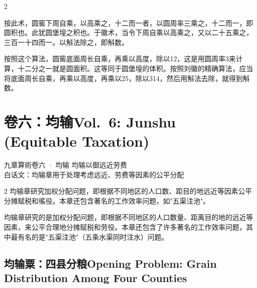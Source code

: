 \documentclass[11pt,a4paper]{article}
\newcommand{\bilingualsection}[2]{%
  \section{#1\hfill\normalfont\large\color{sectioncolor}#2}%
}
\newcommand{\bilingualsubsection}[2]{%
  \subsection{#1\hfill\normalfont\normalsize\color{sectioncolor}#2}%
}
\begin{document}
\vspace{0.2cm}

\begin{paracol}{2}

\begin{commentarybox}
按此术，圆窖下周自乘，以高乘之，十二而一者，以圆周率三乘之，十二而一，即圆积也。此犹圆堡堭之积也。于徽术，当令下周自乘以高乘之，又以二十五乘之，三百一十四而一。以斛法除之，即斛数。
\end{commentarybox}

\switchcolumn

\begin{commentarybox}
按照这个算法，圆窖底面周长自乘，再乘以高度，除以12，这是用圆周率3来计算，十二分之一就是圆面积。这等同于圆堡堭的体积。按照刘徽的精确算法，应当将底面周长自乘，再乘以高度，再乘以25，除以314，然后用斛法去除，就得到斛数。
\end{commentarybox}

\end{paracol}

\newpage

\bilingualsection{卷六：均输}{Vol.\ 6: Junshu (Equitable Taxation)}

\begin{volumeheader}{九章算術卷六 · 均输}
均输以御远近劳费\\[0.3em]
\small 白话文：均输章用于处理考虑远近、劳费等因素的公平分配
\end{volumeheader}

\vspace{0.5cm}

\begin{paracol}{2}
均输章研究加权分配问题，即根据不同地区的人口数、距目的地远近等因素公平分摊赋税和徭役。本章还包含著名的工作效率问题，如"五渠注池"。

\switchcolumn

均输章研究的是加权分配问题，即根据不同地区的人口数量、距离目的地的远近等因素，来公平合理地分摊赋税和劳役。本章还包含了许多著名的工作效率问题，其中最有名的是"五渠注池"（五条水渠同时注水）问题。

\end{paracol}

\vspace{0.5cm}

\bilingualsubsection{均输粟：四县分粮}{Opening Problem: Grain Distribution Among Four Counties}
\end{document}
